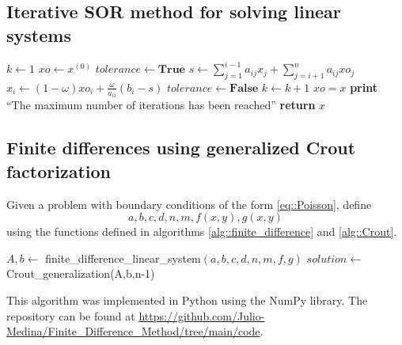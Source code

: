 \documentclass[a4paper]{article}
\begin{document}
\subsection{Iterative SOR method for solving linear systems}
\begin{algorithm}[H]
\caption{Iterative SOR method for solving linear systems}\label{alg::SOR}
\begin{algorithmic}[H]
\State $k \gets 1$
\State $xo \gets x^{(0)}$
\State $tolerance\gets \textbf{True}$
\State $s \gets \sum_{j=1}^{i-1} a_{ij}x_j + \sum_{j=i+1}^{n} a_{ij}xo_j$
\State $x_i \gets (1-\omega) xo_i + \frac{\omega}{a_{ii}} (b_i - s)$
\EndFor
{}
\State $tolerance\gets \textbf{False}$
\EndIf
\State $k \gets k+1$
\State $xo=x$
\EndWhile
{}
\State \textbf{print} ``The maximum number of iterations has been reached''
\EndIf
\State \textbf{return} $x$
\EndFunction
\end{algorithmic}
\end{algorithm}

\subsection{Finite differences using generalized Crout factorization}
\begin{algorithm}[H]
\caption{Finite difference algorithm using generalized Crout factorization}\label{alg::finite_diff_Crout}
Given a problem with boundary conditions of the form \ref{eq::Poisson}, define
\begin{equation*}
a,b,c,d,n,m,f(x,y),g(x,y)
\end{equation*}
using the functions defined in algorithms \ref{alg::finite_difference} and \ref{alg::Crout}.
\begin{algorithmic}
\State $A, b\gets$ finite\_difference\_linear\_system$(a,b,c,d,n,m,f,g)$
\State $solution\gets $ Crout\_generalization(A,b,n-1)
\end{algorithmic}
\end{algorithm}
This algorithm was implemented in Python using the NumPy library. The repository can be found at \url{https://github.com/Julio-Medina/Finite_Difference_Method/tree/main/code}.
\end{document}
